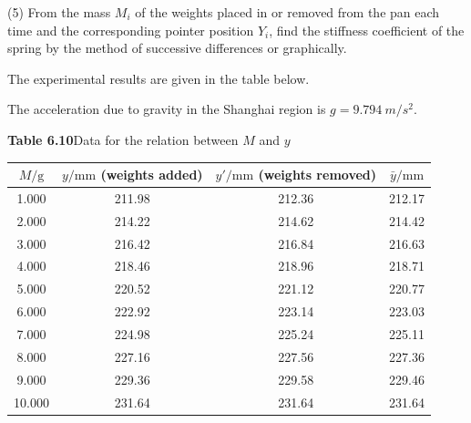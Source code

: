 (5) From the mass $M_i$ of the weights placed in or removed from the pan each time and the corresponding pointer position $Y_i$, find the stiffness coefficient of the spring by the method of successive differences or graphically.

The experimental results are given in the table below.

The acceleration due to gravity in the Shanghai region is $g=\SI{9.794}{m/s^2}$.

\begin{center}
\textbf{Table 6.10}\quad Data for the relation between $M$ and $y$\\[3pt]
\begin{tabular}{cccc}
\toprule
$M/\mathrm{g}$ & $y/\mathrm{mm}$ (weights added) & $y'/\mathrm{mm}$ (weights removed) & $\bar y/\mathrm{mm}$\\
\midrule
1.000  & 211.98 & 212.36 & 212.17\\
2.000  & 214.22 & 214.62 & 214.42\\
3.000  & 216.42 & 216.84 & 216.63\\
4.000  & 218.46 & 218.96 & 218.71\\
5.000  & 220.52 & 221.12 & 220.77\\
6.000  & 222.92 & 223.14 & 223.03\\
7.000  & 224.98 & 225.24 & 225.11\\
8.000  & 227.16 & 227.56 & 227.36\\
9.000  & 229.36 & 229.58 & 229.46\\
10.000 & 231.64 & 231.64 & 231.64\\
\bottomrule
\end{tabular}
\end{center}

